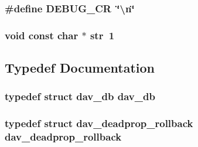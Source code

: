 \subsubsection[{\texorpdfstring{D\+E\+B\+U\+G\+\_\+\+CR}{DEBUG_CR}}]{\setlength{\rightskip}{0pt plus 5cm}\#define D\+E\+B\+U\+G\+\_\+\+CR~\char`\"{}\textbackslash{}n\char`\"{}}\hypertarget{group__MOD__DAV_ga5a242a2983fe78462523e34b6d6e3628}{}\label{group__MOD__DAV_ga5a242a2983fe78462523e34b6d6e3628}
\subsubsection[{\texorpdfstring{str}{str}}]{ {\bf void} const char $\ast$ str~1}\hypertarget{group__MOD__DAV_gaab9226fe8f632e1f998e24276d478f30}{}\label{group__MOD__DAV_gaab9226fe8f632e1f998e24276d478f30}


\subsection{Typedef Documentation}
\subsubsection[{\texorpdfstring{dav\+\_\+db}{dav_db}}]{\setlength{\rightskip}{0pt plus 5cm}typedef struct {\bf dav\+\_\+db} {\bf dav\+\_\+db}}\hypertarget{group__MOD__DAV_ga7600f4d1916918bf969eb543c5399568}{}\label{group__MOD__DAV_ga7600f4d1916918bf969eb543c5399568}
\subsubsection[{\texorpdfstring{dav\+\_\+deadprop\+\_\+rollback}{dav_deadprop_rollback}}]{\setlength{\rightskip}{0pt plus 5cm}typedef struct {\bf dav\+\_\+deadprop\+\_\+rollback} {\bf dav\+\_\+deadprop\+\_\+rollback}}\hypertarget{group__MOD__DAV_ga6fd5e66543b954f28aef968ede259862}{}\label{group__MOD__DAV_ga6fd5e66543b954f28aef968ede259862}
